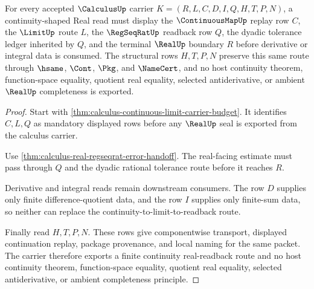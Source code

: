 \begin{theorem}
\label{thm:calculus-continuity-real-readback-obligation}
For every accepted $\CalculusUp$ carrier $K=(R,L,C,D,I,Q,H,T,P,N)$, a continuity-shaped Real read must display the $\ContinuousMapUp$ replay row $C$, the $\LimitUp$ route $L$, the $\RegSeqRatUp$ readback row $Q$, the dyadic tolerance ledger inherited by $Q$, and the terminal $\RealUp$ boundary $R$ before derivative or integral data is consumed. The structural rows $H,T,P,N$ preserve this same route through $\hsame$, $\Cont$, $\Pkg$, and $\NameCert$, and no host continuity theorem, function-space equality, quotient real equality, selected antiderivative, or ambient $\RealUp$ completeness is exported.
\end{theorem}
\begin{proof}
Start with \autoref{thm:calculus-continuous-limit-carrier-budget}. It identifies $C,L,Q$ as mandatory displayed rows before any $\RealUp$ seal is exported from the calculus carrier.

Use \autoref{thm:calculus-real-regseqrat-error-handoff}. The real-facing estimate must pass through $Q$ and the dyadic rational tolerance route before it reaches $R$.

Derivative and integral reads remain downstream consumers. The row $D$ supplies only finite difference-quotient data, and the row $I$ supplies only finite-sum data, so neither can replace the continuity-to-limit-to-readback route.

Finally read $H,T,P,N$. These rows give componentwise transport, displayed continuation replay, package provenance, and local naming for the same packet. The carrier therefore exports a finite continuity real-readback route and no host continuity theorem, function-space equality, quotient real equality, selected antiderivative, or ambient completeness principle.
\end{proof}

